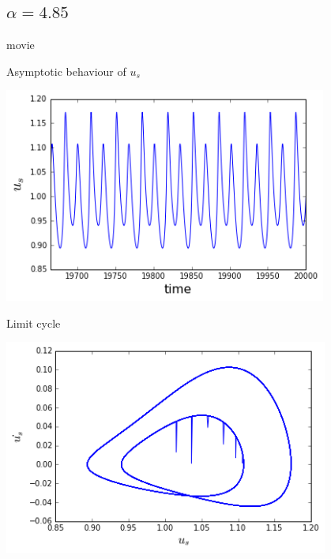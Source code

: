 \documentclass{beamer}
\begin{document}
\subsection{$\alpha = 4.85$}
\begin{frame}{movie}
\begin{figure}[ht]
\end{figure}
\end{frame}
\begin{frame}{Asymptotic behaviour of $u_s$}
  \begin{center}
  	\includegraphics[height=200pt]{485}\\
  	
  \end{center}	
\end{frame}
\begin{frame}{Limit cycle}
	\begin{center}
		\includegraphics[height=200pt]{lim485}\\
		
	\end{center}	
\end{frame}
\end{document}
